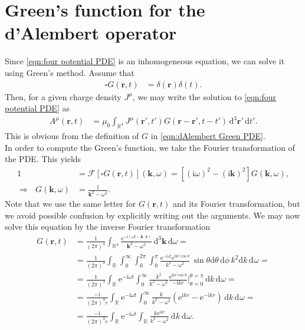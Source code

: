 \documentclass[english, parskip=full]{scrartcl}
\newcommand{\intx}{}
\newcommand{\intr}{}
\newcommand{\kla}{}
\newcommand{\klam}{}
\newcommand{\tecxt}{}
\renewcommand{\i}{\text{i}}
\newcommand{\e}{\text{e}}
\newcommand*{\F}{\mathcal{F}}
\begin{document}
\section{Green's function for the d'Alembert operator}
Since \autoref{eqn:four potential PDE} is an inhomogeneous equation, we can solve it using Green's method.
Assume that
\begin{align}
\square G(\textbf{r},t) &= \delta (\textbf{r})\delta (t). \label{eqn:dAlembert Green PDE}
\end{align}
Then, for a given charge density $J^\mu$, we may write the solution to \autoref{eqn:four potential PDE} as 
\begin{align}
A^\mu(\textbf{r},t) &= \mu_0 \intr\int_{\mathbb{R}^{4}} J^\mu(\textbf{r}',t') G(\textbf{r}-\textbf{r}', t-t')\, \mathrm{d}^{3}\textbf{r}'\,\tecxt\text{d}t'.
\end{align}
This is obvious from the definition of $G$ in \autoref{eqn:dAlembert Green PDE}.
\\
In order to compute the Green's function, we take the Fourier transformation of the PDE.
This yields
\begin{align}
1 &= \F\klam\left[ \square G(\textbf{r},t) \right](\textbf{k},\omega) =  \klam\left[ (\i\omega)^2 - (\i\textbf{k})^2 \right] G(\textbf{k},\omega),\\
\Rightarrow\ \ \ G(\textbf{k},\omega) &= \frac{1}{\textbf{k}^2 - \omega^2}.
\end{align}
Note that we use the same letter for $G(\textbf{r},t)$ and its Fourier transformation, but we avoid possible confusion by explicitly writing out the arguments.
We may now solve this equation by the inverse Fourier transformation
\begin{align}
G(\textbf{r},t) &= \frac{1}{(2\pi)^4} \intr\int_{\mathbb{R}^{4}} \frac{\e^{-\i (\omega t - \textbf{k}\cdot \textbf{r})} }{\textbf{k}^2 - \omega^2} \, \mathrm{d}^{3}\textbf{k}\, \tecxt\text{d}\omega = \\
&= \frac{1}{(2\pi)^4} \intr\int_{\mathbb{R}^{ }} \intx\int_{0}^{\infty} \intx\int_{0}^{2\pi} \intx\int_{0}^{\pi} \frac{\e^{-\i\omega t} \e^{\i kr\cos\theta}}{k^2 - \omega^2} \, \sin\theta\mathrm{d}\theta\, \mathrm{d}\phi\, k^2\mathrm{d}k \, \mathrm{d}^{ }\omega = \\
&= \frac{1}{(2\pi)^3} \intr\int_{\mathbb{R}^{ }} \e^{-\i\omega t} \intx\int_{0}^{\infty} \frac{k^2}{k^2 - \omega^2} \frac{\e^{\i kr \cos\theta}}{-\i kr}\bigg\vert_{\theta=0}^{\theta=\pi}\, \mathrm{d}k \, \mathrm{d}^{ }\omega = \\
&= \frac{-\i}{(2\pi)^3 r} \intr\int_{\mathbb{R}^{ }} \e^{-\i\omega t} \intx\int_{0}^{\infty} \frac{k}{k^2 - \omega^2} \kla\left( \e^{\i kr} - \e^{-\i kr} \right) \, \mathrm{d}k \, \mathrm{d}^{ }\omega = \\
&= \frac{-\i}{(2\pi)^3 r} \intr\int_{\mathbb{R}^{ }} \e^{-\i\omega t} \intr\int_{\mathbb{R}^{ }} \frac{k\e^{\i kr}}{k^2 - \omega^2} \, \mathrm{d}^{ }k \, \mathrm{d}^{ }\omega . \label{eqn:dAlembert Green partial result}
\end{align}
\end{document}
